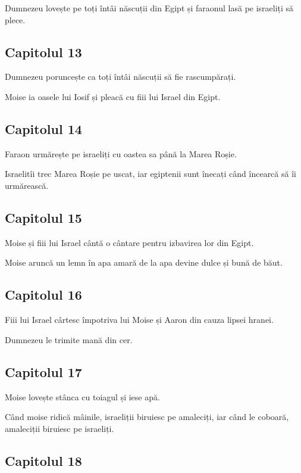 \documentclass[12pt,a4paper]{article}
\begin{document}
Dumnezeu lovește pe toți întâi născuții din Egipt și faraonul lasă pe israeliți să plece.

\subsection{Capitolul 13}

Dumnezeu poruncește ca toți întâi născuții să fie rascumpărați.

Moise ia oasele lui Iosif și pleacă cu fiii lui Israel din Egipt.

\subsection{Capitolul 14}

Faraon urmărește pe israeliți cu oastea sa până la Marea Roșie.

Israelitîi trec Marea Roșie pe uscat, iar egiptenii sunt înecați când încearcă să îi urmărească.

\subsection{Capitolul 15}

Moise și fiii lui Israel cântă o cântare pentru izbavirea lor din Egipt.

Moise aruncă un lemn în apa amară de la apa devine dulce și bună de băut.

\subsection{Capitolul 16}

Fiii lui Israel cârtesc împotriva lui Moise și Aaron din cauza lipsei hranei.

Dumnezeu le trimite mană din cer.

\subsection{Capitolul 17}

Moise lovește stânca cu toiagul și iese apă.

Când moise ridică mâinile, israeliții biruiesc pe amaleciți, iar când le coboară, amaleciții biruiesc pe israeliți.

\subsection{Capitolul 18}
\end{document}
